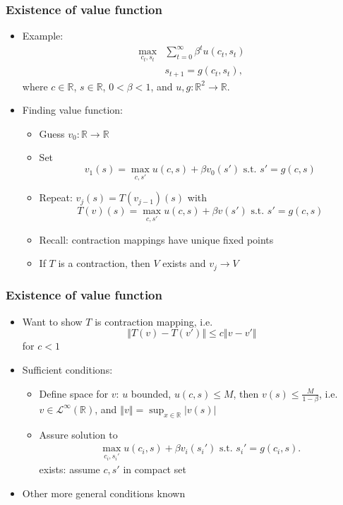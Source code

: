 \documentclass[compress]{beamer}
\def\R{\mathbb{R}}
\newcommand{\norm}[1]{\left\Vert {#1} \right\Vert}
\newcommand{\abs}[1]{\left\vert {#1} \right\vert}
\renewcommand{\to}{{\rightarrow}}
\begin{document}
\begin{frame}\frametitle{Existence of value function}
  \begin{itemize}
  \item Example:
    \begin{align*}
      \max_{c_t,s_t} & \sum_{t=0}^\infty \beta^t u(c_t,s_t) \\
      & s_{t+1} = g(c_t,s_t),
    \end{align*}
    where $c \in \R$, $s \in \R$, $0<\beta<1$, and $u,g:\R^2 \to \R$.
  \item Finding value function:
    \begin{itemize}
    \item Guess $v_0: \R\to \R$
    \item Set 
      \[ v_1(s) = \max_{c,s'} u(c,s) + \beta v_0(s') \text{ s.t. }
      s'=g(c,s) \]
    \item Repeat: $v_j(s) = T(v_{j-1})(s)$ with 
      \[ T(v)(s) = \max_{c,s'} u(c,s) + \beta v(s') \text{ s.t. }
      s'=g(c,s) \]
    \item Recall: contraction mappings  have unique fixed points 
    \item If $T$ is a contraction, then $V$ exists and $v_j \to V$
    \end{itemize} 
  \end{itemize}
\end{frame}

\begin{frame}
  \frametitle{Existence of value function}
  \begin{itemize}
  \item Want to show $T$ is contraction mapping, i.e.\
    \[ \norm{T(v) - T(v')} \leq c \norm{v-v'} \]
    for $c < 1$
  \item Sufficient conditions:
    \begin{itemize}
    \item Define space for $v$: $u$ bounded, $u(c,s) \leq M$, then
      $v(s) \leq \frac{M}{1-\beta}$, i.e. $v \in
      \mathcal{L}^\infty(\R)$, and $\norm{v} = \sup_{x \in \R}
      \abs{v(s)}$
    \item Assure solution to 
      \begin{align*}
        \max_{c_i,s_i'} u(c_i,s) + \beta v_i(s_i') \text{ s.t. }
        s_i'=g(c_i,s).
      \end{align*}
      exists: assume $c,s'$ in compact set
    \end{itemize}
  \item Other more general conditions known
  \end{itemize}
\end{frame}
\end{document}
